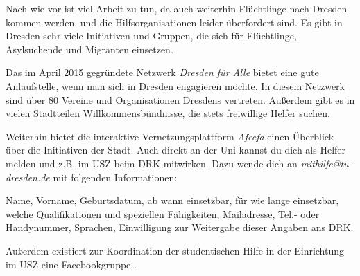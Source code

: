 Nach wie vor ist viel Arbeit zu tun, da auch weiterhin Flüchtlinge nach Dresden kommen werden, und die Hilfsorganisationen leider überfordert sind. Es gibt in Dresden sehr viele Initiativen und Gruppen, die sich für Flüchtlinge, Asylsuchende und Migranten einsetzen. 

Das im April 2015 gegründete Netzwerk \textit{Dresden für Alle}  bietet eine gute Anlaufstelle, wenn man sich in Dresden engagieren möchte. In diesem Netzwerk sind über 80 Vereine und Organisationen Dresdens vertreten. Außerdem gibt es in vielen Stadtteilen Willkommensbündnisse, die stets freiwillige Helfer suchen.

Weiterhin bietet die interaktive Vernetzungsplattform \textit{Afeefa}  einen Überblick über die Initiativen der Stadt. Auch direkt an der Uni kannst du dich als Helfer melden und z.B. im USZ beim DRK mitwirken. Dazu wende dich an \textit{mithilfe@tu-dresden.de} mit folgenden Informationen:

Name, Vorname, Geburtsdatum, ab wann einsetzbar, für wie lange einsetzbar, welche Qualifikationen und speziellen Fähigkeiten, Mailadresse, Tel.- oder Handynummer, Sprachen, Einwilligung zur Weitergabe dieser Angaben ans DRK.

Außerdem existiert zur Koordination der studentischen Hilfe in der Einrichtung im USZ eine Facebookgruppe .

